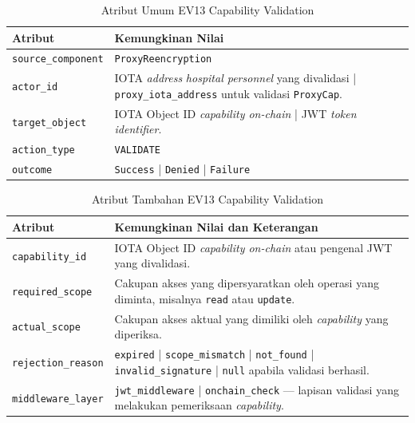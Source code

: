 \begin{table}[htbp]
\centering
\caption{Atribut Umum EV13 Capability Validation}
\label{tab:ev13-umum}
\renewcommand{\arraystretch}{1.3}
\begin{tabular}{|p{3.5cm}|p{8.5cm}|}
\hline
\textbf{Atribut} & \textbf{Kemungkinan Nilai} \\
\hline
\texttt{source\_component} &
\texttt{ProxyReencryption} \\
\hline
\texttt{actor\_id} &
IOTA \textit{address} \textit{hospital personnel} yang divalidasi |
\texttt{proxy\_iota\_address} untuk validasi \texttt{ProxyCap}. \\
\hline
\texttt{target\_object} &
IOTA Object ID \textit{capability on-chain} | JWT \textit{token identifier}. \\
\hline
\texttt{action\_type} &
\texttt{VALIDATE} \\
\hline
\texttt{outcome} &
\texttt{Success} | \texttt{Denied} | \texttt{Failure} \\
\hline
\end{tabular}
\end{table}

\begin{table}[htbp]
\centering
\caption{Atribut Tambahan EV13 Capability Validation}
\label{tab:ev13-detail}
\renewcommand{\arraystretch}{1.3}
\begin{tabular}{|p{4cm}|p{7.5cm}|}
\hline
\textbf{Atribut} & \textbf{Kemungkinan Nilai dan Keterangan} \\
\hline
\texttt{capability\_id} &
IOTA Object ID \textit{capability on-chain} atau pengenal JWT yang
divalidasi. \\
\hline
\texttt{required\_scope} &
Cakupan akses yang dipersyaratkan oleh operasi yang diminta, misalnya
\texttt{read} atau \texttt{update}. \\
\hline
\texttt{actual\_scope} &
Cakupan akses aktual yang dimiliki oleh \textit{capability} yang
diperiksa. \\
\hline
\texttt{rejection\_reason} &
\texttt{expired} | \texttt{scope\_mismatch} | \texttt{not\_found} |
\texttt{invalid\_signature} | \texttt{null} apabila validasi berhasil. \\
\hline
\texttt{middleware\_layer} &
\texttt{jwt\_middleware} | \texttt{onchain\_check} --- lapisan validasi
yang melakukan pemeriksaan \textit{capability}. \\
\hline
\end{tabular}
\end{table}